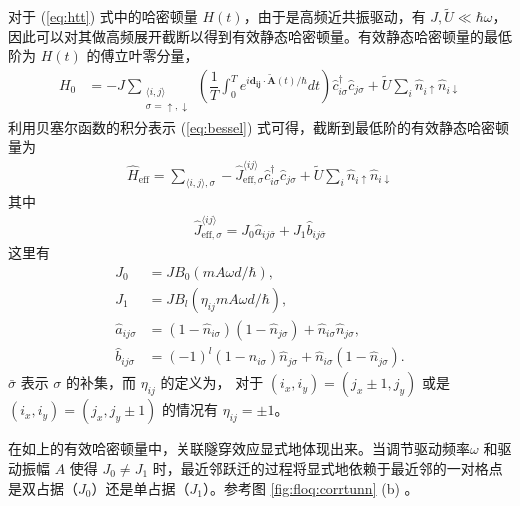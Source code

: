 对于 (\ref{eq:htt}) 式中的哈密顿量 $H(t)$，由于是高频近共振驱动，有 $J, \tilde{U}\ll\hbar\omega$，因此可以对其做高频展开截断以得到有效静态哈密顿量。有效静态哈密顿量的最低阶为 $H(t)$ 的傅立叶零分量，
\begin{align}
H_0 &= -J \sum_{\substack{\langle i,j\rangle \\ \sigma = \uparrow,\downarrow}} \left(\dfrac{1}{T}\int_0^Te^{i\mathbf{d_{ij}}\cdot \tilde{\mathbf{A}}(t)/\hbar}dt\right) \hat{c}_{i\sigma}^{\dagger}\hat{c}_{j\sigma}+ \tilde{U}\sum_i\hat{n}_{i\uparrow}\hat{n}_{i\downarrow} 
\end{align}
利用贝塞尔函数的积分表示 (\ref{eq:bessel}) 式可得，截断到最低阶的有效静态哈密顿量为
\begin{align}
\hat{H}_{\text{eff}} = \sum_{\langle i,j\rangle, \sigma} -\hat{J}^{\langle ij\rangle}_{\text{eff},\sigma}\hat{c}_{i\sigma}^{\dagger}\hat{c}_{j\sigma} + \tilde{U}\sum_{i}\hat{n}_{i\uparrow}\hat{n}_{i\downarrow}
\end{align}
其中
\begin{align}
\hat{J}^{\langle ij\rangle}_{\text{eff},\sigma}=J_0\hat{a}_{ij\bar{\sigma}}+J_1\hat{b}_{ij\bar{\sigma}}
\end{align}
这里有
\begin{align}
J_0 &= JB_0(mA\omega d/\hbar), \\
J_1 &= J B_l(\eta_{ij}mA\omega d/\hbar), \\
\hat{a}_{ij\sigma} &= (1-\hat{n}_{i\sigma})(1-\hat{n}_{j\sigma}) + \hat{n}_{i\sigma}\hat{n}_{j\sigma},\\
\hat{b}_{ij\sigma} &= (-1)^l(1-\hat{n}_{i\sigma})\hat{n}_{j\sigma} + \hat{n}_{i\sigma}(1-\hat{n}_{j\sigma}).
\end{align}
$\bar{\sigma}$ 表示 $\sigma$ 的补集，而
$\eta_{ij}$ 的定义为，
对于 $(i_x,i_y)=(j_x\pm1,j_y)$ 或是 $(i_x,i_y)=(j_x,j_y\pm 1)$ 的情况有 $\eta_{ij}=\pm 1$。

在如上的有效哈密顿量中，关联隧穿效应显式地体现出来。当调节驱动频率$\omega$ 和驱动振幅 $A$ 使得 $J_0\neq J_1$ 时，最近邻跃迁的过程将显式地依赖于最近邻的一对格点是双占据（$J_0$）还是单占据（$J_1$）。参考图 \ref{fig:floq:corrtunn} (b) 。




